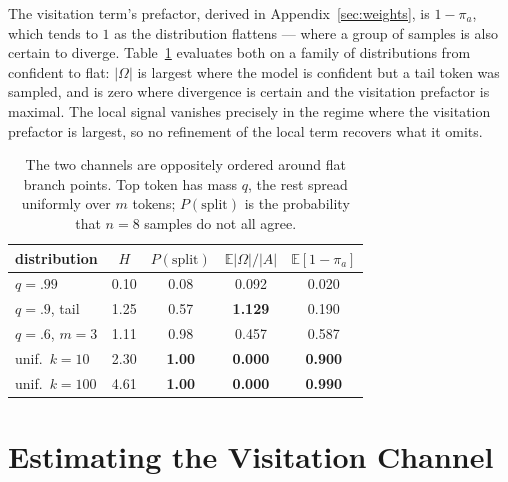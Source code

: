 \documentclass[11pt]{article}
\newcommand{\Om}{\Omega}
\newcommand{\E}{\mathbb{E}}
\begin{document}
The visitation term's prefactor, derived in Appendix~\ref{sec:weights}, is
$1 - \pi_a$, which tends to $1$ as the distribution flattens --- where a group of
samples is also certain to diverge. Table~\ref{tab:anticorr} evaluates both on a
family of distributions from confident to flat: $|\Om|$ is largest where the model is
confident but a tail token was sampled, and is zero where divergence is certain and
the visitation prefactor is maximal. The local signal vanishes precisely in the
regime where the visitation prefactor is largest, so no refinement of the local term
recovers what it omits.

\begin{table}[t]
\centering
\footnotesize
\setlength{\tabcolsep}{3.5pt}
\begin{tabular}{lcccc}
\toprule
distribution & $H$ & $P(\mathrm{split})$ & $\E|\Om|/|A|$ & $\E[1{-}\pi_a]$ \\
\midrule
$q{=}.99$          & 0.10 & 0.08 & 0.092 & 0.020 \\
$q{=}.9$, tail     & 1.25 & 0.57 & \textbf{1.129} & 0.190 \\
$q{=}.6$, $m{=}3$  & 1.11 & 0.98 & 0.457 & 0.587 \\
unif.\ $k{=}10$    & 2.30 & \textbf{1.00} & \textbf{0.000} & \textbf{0.900} \\
unif.\ $k{=}100$   & 4.61 & \textbf{1.00} & \textbf{0.000} & \textbf{0.990} \\
\bottomrule
\end{tabular}
\caption{The two channels are oppositely ordered around flat branch points. Top token
has mass $q$, the rest spread uniformly over $m$ tokens; $P(\text{split})$ is the
probability that $n{=}8$ samples do not all agree.}
\label{tab:anticorr}
\end{table}

\section{Estimating the Visitation Channel}
\label{sec:ahdef}
\end{document}
